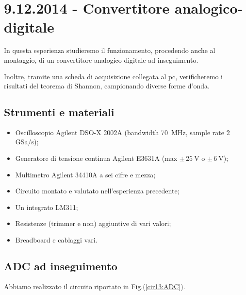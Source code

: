 \section{9.12.2014 - Convertitore analogico-digitale}

In questa esperienza studieremo il funzionamento, procedendo anche al montaggio, di un convertitore analogico-digitale ad inseguimento.

Inoltre, tramite una scheda di acquisizione collegata al pc, verificheremo i risultati del teorema di Shannon, campionando diverse forme d'onda.

\subsection*{Strumenti e materiali}

\begin{itemize} [noitemsep]
	\item Oscilloscopio Agilent DSO-X 2002A (bandwidth \SI{70}{\mega\hertz}, sample rate \num{2} GSa/s);
	\item Generatore di tensione continua Agilent E3631A (max $\pm \, \SI{25}{\volt}$ o $\pm \, \SI{6}{\volt}$);
	\item Multimetro Agilent 34410A a sei cifre e mezza;
	\item Circuito montato e valutato nell'esperienza precedente;
\item Un integrato LM311;	
\item Resistenze (trimmer e non) aggiuntive di vari valori;
\item Breadboard e cablaggi vari.
\end{itemize}

\subsection{ADC ad inseguimento}
Abbiamo realizzato il circuito riportato in Fig.(\ref{cir13:ADC}).

